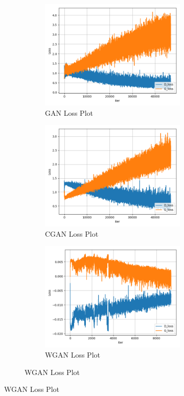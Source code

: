 \documentclass[conference]{IEEEtran}
\begin{document}
\begin{figure}[!h]
\begin{figure}[!h]
    \begin{figure}
        \caption{GAN Loss Plot}
        \label{fig:loss-plot-gan}
        \includegraphics[width=9cm]{GAN_loss.png}
        \centering
    \end{figure}

    \begin{figure}
        \caption{CGAN Loss Plot}
        \label{fig:loss-plot-cgan}
        \includegraphics[width=9cm]{CGAN_loss.png}
        \centering
    \end{figure}

    \begin{figure}
        \caption{WGAN Loss Plot}
        \label{fig:loss-plot-wgan}
        \includegraphics[width=9cm]{WGAN_loss.png}
        \centering
    \end{figure}


\end{figure}
\end{figure}
\end{document}
